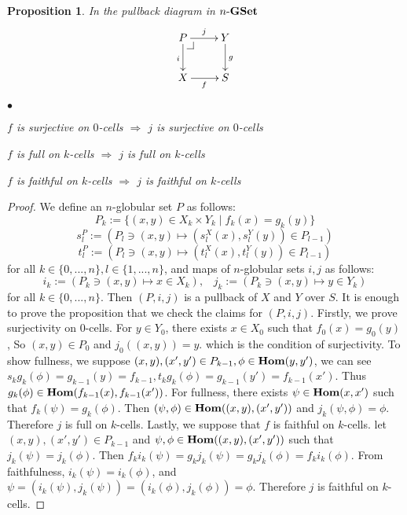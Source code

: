 \documentclass[12pt]{article}
\makeatletter
\theoremstyle{plain}
\newtheorem{proposition}[theorem]{Proposition}
\theoremstyle{definition}
\newcommand{\pullbackmark}[2]{\save ;p+<.8pc,0pc>:(0,-1)::%
(#1) *{\phantom{Z}} %
;p+(#2)-(0,0) **@{-}%
;p-(#1)+(0,0) *{\phantom{Z}} **@{-} \restore}
\makeatother
\begin{document}
\begin{proposition}
In the pullback diagram in $n \mathchar`- {\bf GSet}$
\[ \xymatrix{
 P \pullbackmark{1,0}{0,1} \ar[r]^j \ar[d]_i & Y \ar[d]^g \\
 X \ar[r]_f & S
} \]
\begin{list}{$\bullet$}{}
\item $f$ is surjective on $0$-cells $\Rightarrow$ $j$ is surjective on $0$-cells
\item $f$ is full on $k$-cells $\Rightarrow$ $j$ is full on $k$-cells
\item $f$ is faithful on $k$-cells $\Rightarrow$ $j$ is faithful on $k$-cells
\end{list}
\end{proposition}

\begin{proof} We define an $n$-globular set $P$ as follows:
\[ P_k := \{ (x,y) \in X_k \times Y_k \mid f_k(x)=g_k(y) \}  \]
\[ s_l^P := ( P_l \ni (x,y) \mapsto (s_l^X (x), s_l^Y (y) ) \in P_{l-1} ) \]
\[ t_l^P := ( P_l \ni (x,y) \mapsto (t_l^X (x), t_l^Y (y) ) \in P_{l-1} ) \]
for all $k \in \{ 0,...,n \}, l \in \{ 1,...,n \}$, and maps of $n$-globular sets $i,j$ as follows:
\[
i_k := (P_k \ni (x,y) \mapsto x \in X_k), \hspace{10pt} j_k := (P_k \ni (x,y) \mapsto y \in Y_k)
\]
for all $k \in \{ 0,...,n \}$. Then $(P,i,j)$ is a pullback of $X$ and $Y$ over $S$. It is enough to prove the proposition that we check the claims for $(P,i,j)$.
Firstly, we prove surjectivity on $0$-cells. For $y \in Y_0$, there exists $x \in X_0$ such that $f_{0}(x)=g_{0}(y)$, So $(x,y) \in P_{0}$ and $j_{0}((x,y))=y$. which is the condition of surjectivity.
To show fullness, we suppose $(x,y), (x',y') \in P_{k-1}, \phi \in {\bf Hom}(y,y')$, we can see $s_{k} g_{k}(\phi)=g_{k-1}(y)=f_{k-1}, t_{k} g_{k} (\phi)=g_{k-1} (y')=f_{k-1} (x')$. Thus $g_{k} (\phi) \in {\bf Hom}(f_{k-1}(x), f_{k-1}(x'))$. For fullness, there exists $\psi \in {\bf Hom}(x,x')$ such that $f_k (\psi) = g_k (\phi)$. Then $(\psi , \phi ) \in {\bf Hom}((x,y),(x',y'))$ and $j_k (\psi ,\phi ) =\phi$. Therefore $j$ is full on $k$-cells. 
Lastly, we suppose that $f$ is faithful on $k$-cells. let $(x,y), (x',y') \in P_{k-1}$ and $ \psi, \phi \in {\bf Hom}((x,y), (x', y'))$ such that $j_{k}(\psi)=j_{k}(\phi)$. Then $f_k i_k(\psi)=g_k j_k (\psi)=g_k j_k (\phi)=f_k i_k(\phi)$. From faithfulness, $i_k (\psi)= i_k (\phi)$, and $\psi = (i_k (\psi ), j_k (\psi ))=(i_k (\phi ), j_k (\phi ))=\phi $. Therefore $j$ is faithful on $k$-cells.
\end{proof}
\end{document}
